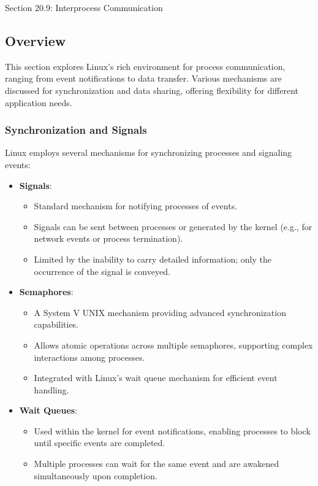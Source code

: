 \begin{notes}{Section 20.9: Interprocess Communication}
    \subsection*{Overview}

    This section explores Linux's rich environment for process communication, ranging from event notifications to data transfer. Various mechanisms are discussed for synchronization and data sharing, 
    offering flexibility for different application needs.
    
    \subsubsection*{Synchronization and Signals}
    
    Linux employs several mechanisms for synchronizing processes and signaling events:
    \begin{itemize}
        \item \textbf{Signals}:
        \begin{itemize}
            \item Standard mechanism for notifying processes of events.
            \item Signals can be sent between processes or generated by the kernel (e.g., for network events or process termination).
            \item Limited by the inability to carry detailed information; only the occurrence of the signal is conveyed.
        \end{itemize}
        \item \textbf{Semaphores}:
        \begin{itemize}
            \item A System V UNIX mechanism providing advanced synchronization capabilities.
            \item Allows atomic operations across multiple semaphores, supporting complex interactions among processes.
            \item Integrated with Linux's wait queue mechanism for efficient event handling.
        \end{itemize}
        \item \textbf{Wait Queues}:
        \begin{itemize}
            \item Used within the kernel for event notifications, enabling processes to block until specific events are completed.
            \item Multiple processes can wait for the same event and are awakened simultaneously upon completion.
        \end{itemize}
    \end{itemize}
    

\end{notes}
